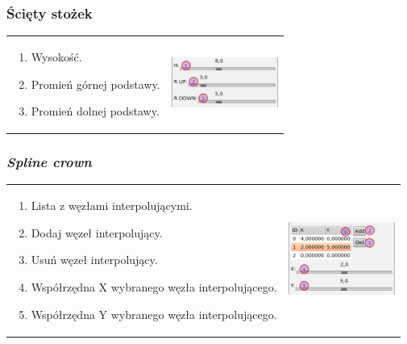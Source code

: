\subsubsection{Ścięty stożek}
\begin{tabular}{lr}
\parbox[c]{95mm}{
\begin{enumerate}
	\item {Wysokość.}
	\item {Promień górnej podstawy.}
	\item {Promień dolnej podstawy.}
\end{enumerate}
} &
\parbox[c]{35mm}{
\includegraphics[width=35mm]{images/gui/truncated_cone_crown.png}
}\\
\end{tabular}

\subsubsection{\textit{Spline crown}}
\begin{tabular}{lr}
\parbox[c]{95mm}{
\begin{enumerate}
	\item {Lista z węzłami interpolującymi.}
	\item {Dodaj węzeł interpolujący.}
	\item {Usuń węzeł interpolujący.}
	\item {Współrzędna X wybranego węzła interpolującego.}
	\item {Współrzędna Y wybranego węzła interpolującego.}
\end{enumerate}
} &
\parbox[c]{35mm}{
\includegraphics[width=35mm]{images/gui/spline_crown.png}
}\\
\end{tabular}


